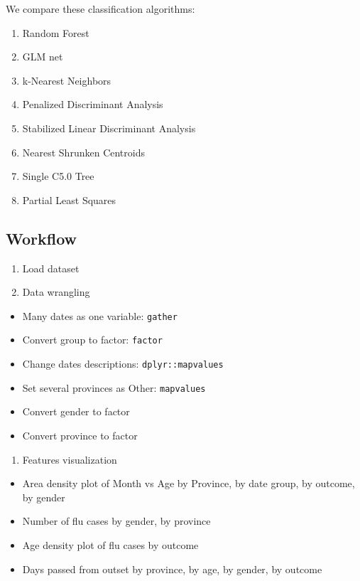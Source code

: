 \documentclass[]{book}
\providecommand{\tightlist}{%
  \setlength{\itemsep}{0pt}\setlength{\parskip}{0pt}}
\begin{document}
We compare these classification algorithms:

\begin{enumerate}
\def\labelenumi{\arabic{enumi}.}
\tightlist
\item
  Random Forest
\item
  GLM net
\item
  k-Nearest Neighbors
\item
  Penalized Discriminant Analysis
\item
  Stabilized Linear Discriminant Analysis
\item
  Nearest Shrunken Centroids
\item
  Single C5.0 Tree
\item
  Partial Least Squares
\end{enumerate}

\hypertarget{workflow-4}{%
\subsection{Workflow}\label{workflow-4}}

\begin{enumerate}
\def\labelenumi{\arabic{enumi}.}
\tightlist
\item
  Load dataset
\item
  Data wrangling
\end{enumerate}

\begin{itemize}
\tightlist
\item
  Many dates as one variable: \texttt{gather}
\item
  Convert group to factor: \texttt{factor}
\item
  Change dates descriptions: \texttt{dplyr::mapvalues}
\item
  Set several provinces as Other: \texttt{mapvalues}
\item
  Convert gender to factor
\item
  Convert province to factor
\end{itemize}

\begin{enumerate}
\def\labelenumi{\arabic{enumi}.}
\setcounter{enumi}{2}
\tightlist
\item
  Features visualization
\end{enumerate}

\begin{itemize}
\tightlist
\item
  Area density plot of Month vs Age by Province, by date group, by outcome, by gender
\item
  Number of flu cases by gender, by province
\item
  Age density plot of flu cases by outcome
\item
  Days passed from outset by province, by age, by gender, by outcome
\end{itemize}
\end{document}
